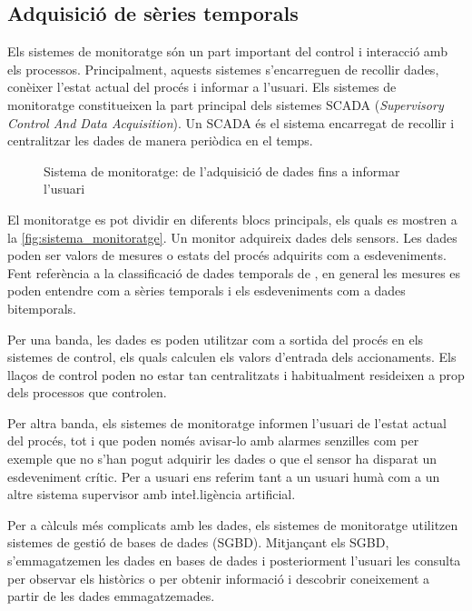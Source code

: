 \subsection{Adquisició de sèries temporals}

Els sistemes de monitoratge són un part important del control i interacció amb els processos. Principalment, aquests sistemes s'encarreguen de recollir dades, conèixer l'estat actual del procés i informar a l'usuari. Els sistemes de monitoratge constitueixen la part principal dels sistemes SCADA (\emph{Supervisory Control And Data Acquisition}). Un SCADA  és el sistema encarregat de recollir i centralitzar les dades de manera periòdica en el temps.



\begin{figure}[tp]
  \begin{center}
    \scriptsize 
    
  \end{center}
  \caption{Sistema de monitoratge: de l'adquisició de dades fins a informar l'usuari}
  \label{fig:sistema_monitoratge}
\end{figure}


El monitoratge es pot dividir en diferents blocs principals, els quals es mostren a la \autoref{fig:sistema_monitoratge}. Un monitor adquireix dades dels sensors. Les dades poden ser valors de mesures o estats del procés adquirits com a esdeveniments. Fent referència a la classificació de dades temporals de \textcite{assfalg08:thesis}, en general les mesures es poden entendre com a sèries temporals i els esdeveniments com a dades bitemporals.

Per una banda, les dades es poden utilitzar com a sortida del procés en els sistemes de control, els quals calculen els valors d'entrada dels accionaments.
Els llaços de control poden no estar tan centralitzats i habitualment resideixen a prop dels processos que controlen.

Per altra banda, els sistemes de monitoratge informen l'usuari de l'estat actual del procés, tot i que poden només avisar-lo amb alarmes senzilles com per exemple que no s'han pogut adquirir les dades o que el sensor ha disparat un esdeveniment crític. Per a usuari ens referim tant a un usuari humà com a un altre sistema supervisor amb inte\l.ligència artificial. 

Per a càlculs més complicats amb les dades, els sistemes de monitoratge utilitzen sistemes de gestió de bases de dades (SGBD). Mitjançant els SGBD, s'emmagatzemen les dades en bases de dades i posteriorment l'usuari les consulta per observar els històrics o per obtenir informació i descobrir coneixement a partir de les dades emmagatzemades. 


